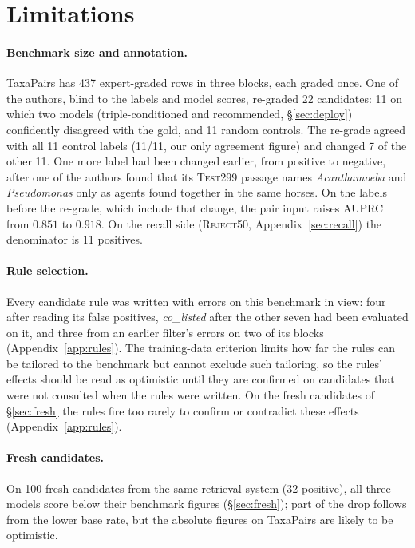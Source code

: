 \documentclass[11pt]{article}
\newcommand{\bench}{\mbox{TaxaPairs}}
\begin{document}
\section*{Limitations}

\paragraph{Benchmark size and annotation.}
\bench{} has 437 expert-graded rows in three blocks, each graded once. One of the authors, blind to the labels
and model scores, re-graded 22 candidates: 11 on which two models (triple-conditioned and
recommended, \S\ref{sec:deploy}) confidently disagreed with the gold, and 11 random controls. The
re-grade agreed with all 11 control labels (11/11, our only agreement figure) and changed 7 of the
other 11. One more label had been changed earlier, from positive to negative, after one of the
authors found that its \textsc{Test299} passage names \emph{Acanthamoeba} and \emph{Pseudomonas}
only as agents found together in the same horses. On the labels before the re-grade, which include
that change, the pair input raises AUPRC from $0.851$ to $0.918$. On the recall side (\textsc{Reject50}, Appendix~\ref{sec:recall}) the
denominator is 11 positives.

\paragraph{Rule selection.}
Every candidate rule was written with errors on this benchmark in view: four after reading its false
positives, \emph{co\_listed} after the other seven had been evaluated on it, and three from an earlier
filter's errors on two of its blocks (Appendix~\ref{app:rules}). The training-data criterion limits how
far the rules can be tailored to the benchmark but cannot exclude such tailoring, so the rules' effects should
be read as optimistic until they are confirmed on candidates that were not consulted when the rules
were written. On the fresh candidates of \S\ref{sec:fresh} the rules fire too rarely to confirm or
contradict these effects (Appendix~\ref{app:rules}).

\paragraph{Fresh candidates.}
On 100 fresh candidates from the same retrieval system (32 positive), all three models score
below their benchmark figures (\S\ref{sec:fresh}); part of the drop follows from the lower base rate,
but the absolute figures on \bench{} are likely to be optimistic.
\end{document}
